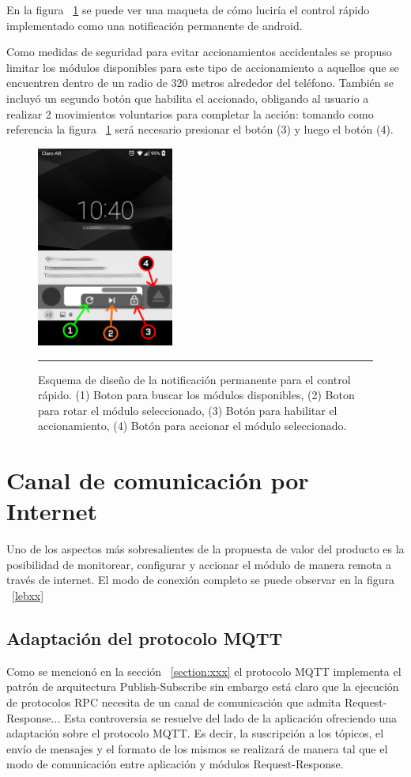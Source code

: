 En la figura ~\ref{fig:notif_design} se puede ver una maqueta de cómo luciría el control rápido implementado como una notificación permanente de android.

Como medidas de seguridad para evitar accionamientos accidentales se propuso limitar los módulos
disponibles para este tipo de accionamiento a aquellos que se encuentren dentro de un radio de 320 metros alrededor del teléfono. También se incluyó un segundo botón que habilita el accionado, obligando al usuario a realizar 2 movimientos voluntarios para completar la acción: tomando como referencia la figura ~\ref{fig:notif_design} será necesario presionar el botón (3) y luego el botón (4).


\begin{figure}[htbp]
	\centering
	\includegraphics[width=0.4\textwidth]{Figures/iter3/module_notif.png}
	\rule{35em}{1pt}
	\caption[Wireframe]{Esquema de diseño de la notificación permanente para el control rápido. (1) Boton para buscar los módulos disponibles, (2) Boton para rotar el módulo seleccionado, (3) Botón para habilitar el accionamiento, (4) Botón para accionar el módulo seleccionado.}
	\label{fig:notif_design}
\end{figure}

\section{Canal de comunicación por Internet}
Uno de los aspectos más sobresalientes de la propuesta de valor del producto es la posibilidad
de monitorear, configurar y accionar el módulo de manera remota a través de internet.
El modo de conexión completo se puede observar en la figura ~\ref{lebxx} 
\subsection{Adaptación del protocolo MQTT}
Como se mencionó en la sección ~\ref{section:xxx} el protocolo MQTT implementa el patrón de arquitectura Publish-Subscribe
sin embargo está claro que la ejecución de protocolos RPC necesita de un canal de comunicación que admita  Request-Response...
Esta controversia se resuelve del lado de la aplicación ofreciendo una adaptación sobre el protocolo MQTT.
Es decir, la suscripción a los tópicos, el envío de mensajes y el formato de los mismos se realizará de manera tal que el modo de comunicación entre aplicación y módulos Request-Response.
